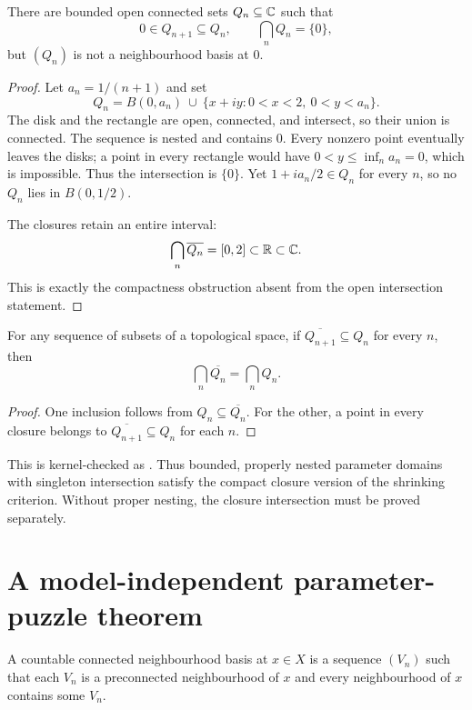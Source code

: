 \begin{proposition}
\label{prop:open-singleton-counterexample}
There are bounded open connected sets $Q_n\subseteq\mathbb C$ such that
\[
 0\in Q_{n+1}\subseteq Q_n,\qquad
 \bigcap_n Q_n=\{0\},
\]
but $(Q_n)$ is not a neighbourhood basis at $0$.
\end{proposition}

\begin{proof}
Let $a_n=1/(n+1)$ and set
\[
 Q_n=B(0,a_n)\ \cup\
      \{x+iy:0<x<2,\ 0<y<a_n\}.
\]
The disk and the rectangle are open, connected, and intersect, so their
union is connected.  The sequence is nested and contains $0$.
Every nonzero point eventually leaves the disks; a point in every
rectangle would have $0<y\le\inf_n a_n=0$, which is impossible.
Thus the intersection is $\{0\}$.  Yet $1+ia_n/2\in Q_n$ for every
$n$, so no $Q_n$ lies in $B(0,1/2)$.

The closures retain an entire interval:
\[
 \bigcap_n\overline{Q_n}=[0,2]\subset\mathbb R\subset\mathbb C.
\]
This is exactly the compactness obstruction absent from the open
intersection statement.
\end{proof}

\begin{lemma}
\label{lem:proper-nesting}
For any sequence of subsets of a topological space, if
$\overline{Q_{n+1}}\subseteq Q_n$ for every $n$, then
\[
 \bigcap_n\overline{Q_n}=\bigcap_n Q_n.
\]
\end{lemma}

\begin{proof}
One inclusion follows from $Q_n\subseteq\overline{Q_n}$.  For the other,
a point in every closure belongs to
$\overline{Q_{n+1}}\subseteq Q_n$ for each $n$.
\end{proof}

This is kernel-checked as
.
Thus bounded, properly nested parameter domains with singleton
intersection satisfy the compact closure version of the shrinking
criterion.  Without proper nesting, the closure intersection must be
proved separately.

\section{A model-independent parameter-puzzle theorem}

\begin{definition}
A countable connected neighbourhood basis at $x\in X$ is a sequence
$(V_n)$ such that each $V_n$ is a preconnected neighbourhood of $x$ and
every neighbourhood of $x$ contains some $V_n$.
\end{definition}

